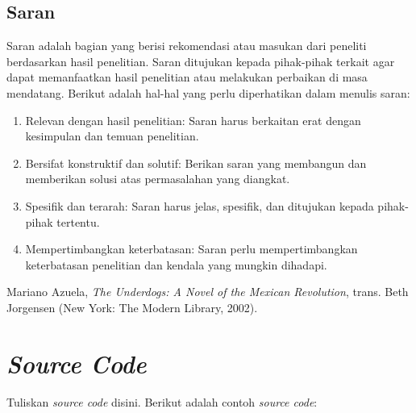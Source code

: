 \documentclass[english,12pt,a4paper]{book}
\begin{document}
\section{Saran}
Saran adalah bagian yang berisi rekomendasi atau masukan dari peneliti berdasarkan hasil penelitian. Saran ditujukan kepada pihak-pihak terkait agar dapat memanfaatkan hasil penelitian atau melakukan perbaikan di masa mendatang. Berikut adalah hal-hal yang perlu diperhatikan dalam menulis saran:
\begin{enumerate}
	\item Relevan dengan hasil penelitian: Saran harus berkaitan erat dengan kesimpulan dan temuan penelitian.
	\item Bersifat konstruktif dan solutif: Berikan saran yang membangun dan memberikan solusi atas permasalahan yang diangkat.
	\item Spesifik dan terarah: Saran harus jelas, spesifik, dan ditujukan kepada pihak-pihak tertentu.
	\item Mempertimbangkan keterbatasan: Saran perlu mempertimbangkan keterbatasan penelitian dan kendala yang mungkin dihadapi.
\end{enumerate}

\begin{thebibliography}{9} 
	 Mariano Azuela, \textit{The Underdogs: A Novel of the Mexican Revolution}, trans. Beth Jorgensen (New York: The Modern Library, 2002). 
\end{thebibliography}

\appendix
	\chapter{\textit{Source Code}}
	Tuliskan \textit{source code} disini. Berikut adalah contoh \textit{source code}:
\end{document}
